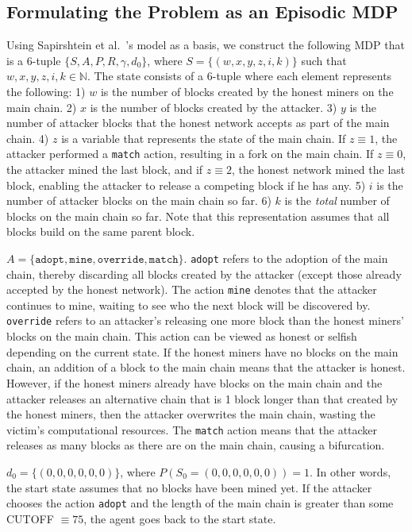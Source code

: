\subsection{Formulating the Problem as an Episodic MDP}
 Using Sapirshtein et al.~\cite{sapirshtein:2015}'s model as a basis, we construct the following MDP that is a 6-tuple $\{S, A, P, R, \gamma, d_0\}$, where $S = \{(w, x, y, z, i, k)\}$ such that $w, x, y, z, i, k \in \mathbb{N}$. The state consists of a 6-tuple where each element represents the following: 1) $w$ is the number of blocks created by the honest miners on the main chain. 2) $x$ is the number of blocks created by the attacker. 3) $y$ is the number of attacker blocks that the honest network accepts as part of the main chain. 4) $z$ is a variable that represents the state of the main chain. If $z \equiv 1$, the attacker performed a {\tt match} action, resulting in a fork on the main chain. If $z \equiv 0$, the attacker mined the last block, and if $z \equiv 2$, the honest network mined the last block, enabling the attacker to release a competing block if he has any. 5) $i$ is the number of attacker blocks on the main chain so far. 6) $k$ is the {\em total} number of blocks on the main chain so far. Note that this representation assumes that all blocks build on the same parent block.

 $A = \{\texttt{adopt}, \texttt{mine}, \texttt{override}, \texttt{match}\}$. \texttt{adopt} refers to the adoption of the main chain, thereby discarding all blocks created by the attacker (except those already accepted by the honest network). The action \texttt{mine} denotes that the attacker continues to mine, waiting to see who the next block will be discovered by. \texttt{override} refers to an attacker's releasing one more block than the honest miners' blocks on the main chain. This action can be viewed as honest or selfish depending on the current state. If the honest miners have no blocks on the main chain, an addition of a block to the main chain means that the attacker is honest. However, if the honest miners already have blocks on the main chain and the attacker releases an alternative chain that is 1 block longer than that created by the honest miners, then the attacker overwrites the main chain, wasting the victim's computational resources. The \texttt{match} action means that the attacker releases as many blocks as there are on the main chain, causing a bifurcation.

 $d_0 = \{(0, 0, 0, 0, 0, 0)\}$, where $P(S_0 = (0, 0, 0, 0, 0, 0)) = 1$. In other words, the start state assumes that no blocks have been mined yet. If the attacker chooses the action \texttt{adopt} and the length of the main chain is greater than some CUTOFF $\equiv 75$, the agent goes back to the start state.

